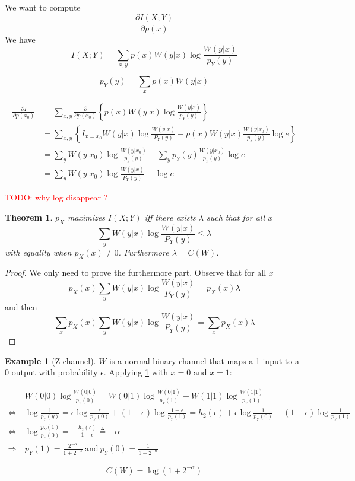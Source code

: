 \documentclass[twoside]{article}
\newtheorem{theorem}{Theorem}[section]
\theoremstyle{definition} %
\newtheorem{example}{Example}
\newcommand{\todo}[1]{\textcolor{red}{TODO: #1}}
\begin{document}


We want to compute
\[
  \frac {\partial  I(X;Y)} {\partial p (x)}
\]
We have
\[
  I(X;Y) = \sum_{x,y} p(x) W(y|x) \log \frac {W(y|x)} {p_Y(y)}
\]

\[
  p_Y(y) = \sum_x p(x) W(y|x)
\]

\begin{align*}
  \frac {\partial I} {\partial p(x_0)}
  &= \sum_{x,y} \frac \partial {\partial p(x_0)}
  \left\{ p(x) W(y|x) \log \frac {W(y|x)} {p_Y(y)} \right\}\\
  &= \sum_{x,y} \left\{ I_{x=x_0} W(y|x)  \log \frac {W(y|x)} {P_Y(y)} -
    p(x)W(y|x) \frac {W(y|x_0)}{p_Y(y)} \log e \right\}\\
  &= \sum_y W(y|x_0) \log \frac {W(y|x_0)}{p_Y(y)} - \sum_y p_Y(y) \frac {W(y|x_0)}{p_Y(y)} \log e\\
  &= \sum_y W(y|x_0) \log \frac {W(y|x)} {P_Y(y)} - \log e
\end{align*}

\todo{why log disappear ?}

\begin{theorem}
  \label{th:1000}
  $p_X$ maximizes $I(X;Y)$ iff there exists $\lambda$ such that for all $x$
  \[
    \sum_y W(y|x) \log \frac {W(y|x)} {P_Y(y)} \leq \lambda
  \]
  with equality when $p_X(x) \not= 0$. Furthermore $\lambda = C(W)$.
\end{theorem}

\begin{proof}
  We only need to prove the furthermore part. Observe that for all $x$
  \[
    p_X(x) \sum_y W(y|x) \log \frac {W(y|x)} {P_Y(y)} =  p_X(x) \lambda
  \]
  and then
  \[
    \sum_x p_X(x) \sum_y W(y|x) \log \frac {W(y|x)} {P_Y(y)} =  \sum_x p_X(x) \lambda
  \]
\end{proof}

\begin{example}[Z channel]
  $W$ is a normal binary channel that maps a 1 input to a 0 output with probability $\epsilon$. Applying \cref{th:1000} with $x=0$ and $x=1$:

  \begin{align*}
    &W(0|0)\log \frac {W(0|0)} {p_Y(0)} = W(0|1)\log \frac {W(0|1)} {p_Y(1)} + W(1|1)\log \frac {W(1|1)} {p_Y(1)}\\
    \iff& \log \frac 1 {p_Y(y)} = \epsilon \log \frac \epsilon {p_Y(0)} + (1-\epsilon) \log \frac {1-\epsilon} {p_Y(1)} = h_2(\epsilon) + \epsilon \log \frac 1 {p_Y(0)} + (1-\epsilon)\log\frac 1 {p_Y(1)}\\
    \iff&\log \frac {p_Y(1)} {p_Y(0)} = - \frac {h_2(\epsilon)}{1-\epsilon} \triangleq -\alpha\\
    \Longrightarrow~&p_Y(1) = \frac {2^{-\alpha}} { 1+2^{-\alpha}} ~\text{and}~p_Y(0) = \frac 1 {1+2^{-\alpha}}
  \end{align*}

  \[
    C(W) = \log (1+2^{-\alpha})
  \]
\end{example}
\end{document}
